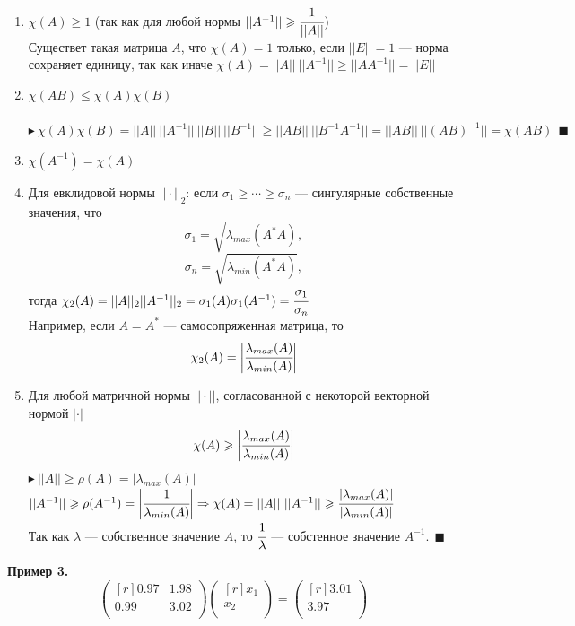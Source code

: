 \documentclass[12pt]{article}
\theoremstyle{definition}
\numberwithin{equation}{section}
\begin{document}
\begin{enumerate}
\item $\chi(A) \geqslant 1$ (так как для любой нормы $||A^{-1}||\geqslant \cfrac{1}{||A||}$)\\
Существет такая матрица $A$, что $\chi(A)=1$ только, если $||E||=1$ --- норма сохраняет единицу, так как иначе $\chi(A)=||A||~||A^{-1}||\geqslant ||AA^{-1}||=||E||$
\item $\chi(AB)\leqslant \chi(A) \chi(B)$\\~\\
$\blacktriangleright~\chi(A) \chi(B)=||A||~||A^{-1}||~||B||~||B^{-1}|| \geqslant ||AB||~||B^{-1}A^{-1}||=||AB||~||(AB)^{-1}||=\chi(AB)~~\blacksquare$
\item $\chi(A^{-1})=\chi(A)$
\item Для евклидовой нормы $||\cdot||_2$: если $\sigma_1\geqslant \cdots \geqslant \sigma_n$ --- сингулярные собственные значения, что $$\sigma_1=\sqrt{\lambda_{max}(A^*A)},$$
$$\sigma_n=\sqrt{\lambda_{min}(A^*A)},$$
тогда $\chi_2(A)=||A||_2||A^{-1}||_2=\sigma_1(A)\sigma_1(A^{-1})=\cfrac{\sigma_1}{\sigma_n}$\\
Например, если $A=A^*$ --- самосопряженная матрица, то $$\chi_2(A)= \bigg | \cfrac{ \lambda_{max}(A)}{ \lambda_{min}(A)} \bigg |$$
\item Для любой матричной нормы $||\cdot||$, согласованной с некоторой векторной нормой $|\cdot|$ $$\chi(A)\geqslant \bigg | \cfrac{ \lambda_{max}(A)}{ \lambda_{min}(A)} \bigg |$$
$\blacktriangleright~||A||\geqslant \rho(A)=|\lambda_{max}(A)|$\\
$||A^{-1}||\geqslant \rho(A^{-1})=\bigg | \cfrac{1}{\lambda_{min}(A)} \bigg | \Rightarrow \chi(A)=||A||~||A^{-1}||\geqslant \cfrac{|\lambda_{max}(A)|}{|\lambda_{min}(A)|}$\\
Так как $\lambda$ --- собственное значение $A$, то $\cfrac{1}{\lambda}$ --- собстенное значение $A^{-1}.~~\blacksquare$
\end{enumerate}
\textbf{Пример 3.}\\
\[\begin{pmatrix}[r]
0.97 & 1.98 \\
0.99 & 3.02 \\
\end{pmatrix} \begin{pmatrix}[r]
x_1 \\
x_2 \\
\end{pmatrix} = \begin{pmatrix}[r]
3.01 \\
3.97 \\
\end{pmatrix}\]
\end{document}
